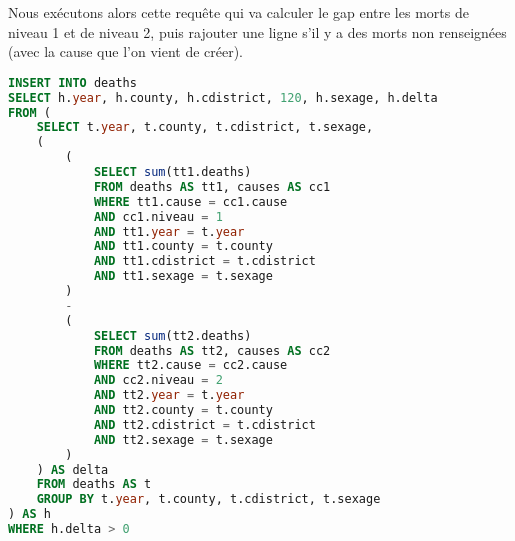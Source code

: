    Nous exécutons alors cette requête qui va calculer le gap entre les morts de niveau 1 et de niveau 2, puis rajouter une ligne
    s'il y a des morts non renseignées (avec la cause que l'on vient de créer).

    \begin{lstlisting}[frame=single, language=SQL]
INSERT INTO deaths
SELECT h.year, h.county, h.cdistrict, 120, h.sexage, h.delta
FROM (
    SELECT t.year, t.county, t.cdistrict, t.sexage,
    (
        (
            SELECT sum(tt1.deaths)
            FROM deaths AS tt1, causes AS cc1
            WHERE tt1.cause = cc1.cause
            AND cc1.niveau = 1
            AND tt1.year = t.year
            AND tt1.county = t.county
            AND tt1.cdistrict = t.cdistrict
            AND tt1.sexage = t.sexage
        )
        -
        (
            SELECT sum(tt2.deaths)
            FROM deaths AS tt2, causes AS cc2
            WHERE tt2.cause = cc2.cause
            AND cc2.niveau = 2
            AND tt2.year = t.year
            AND tt2.county = t.county
            AND tt2.cdistrict = t.cdistrict
            AND tt2.sexage = t.sexage
        )
    ) AS delta
    FROM deaths AS t
    GROUP BY t.year, t.county, t.cdistrict, t.sexage
) AS h
WHERE h.delta > 0
    \end{lstlisting}
